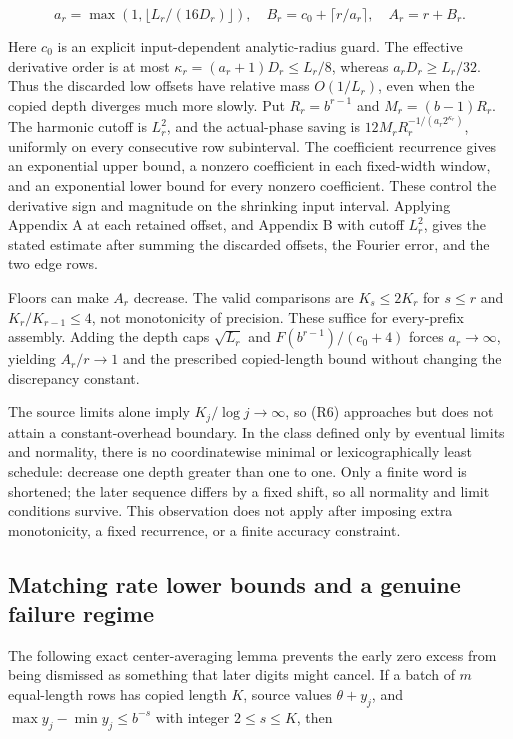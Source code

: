 \documentclass[11pt,a4paper]{article}
\begin{document}
\[
a_r=\max(1,\lfloor L_r/(16D_r)\rfloor),\quad
B_r=c_0+\lceil r/a_r\rceil,\quad A_r=r+B_r.
\]

Here \(c_0\) is an explicit input-dependent analytic-radius guard. The
effective derivative order is at most \(\kappa_r=(a_r+1)D_r\le L_r/8\),
whereas \(a_rD_r\ge L_r/32\). Thus the discarded low offsets have
relative mass \(O(1/L_r)\), even when the copied depth diverges much
more slowly. Put \(R_r=b^{r-1}\) and \(M_r=(b-1)R_r\). The harmonic
cutoff is \(L_r^2\), and the actual-phase saving is
\(12M_rR_r^{-1/(a_r2^{\kappa_r})}\), uniformly on every consecutive row
subinterval. The coefficient recurrence gives an exponential upper
bound, a nonzero coefficient in each fixed-width window, and an
exponential lower bound for every nonzero coefficient. These control the
derivative sign and magnitude on the shrinking input interval. Applying
Appendix A at each retained offset, and Appendix B with cutoff
\(L_r^2\), gives the stated estimate after summing the discarded
offsets, the Fourier error, and the two edge rows.

Floors can make \(A_r\) decrease. The valid comparisons are
\(K_s\le2K_r\) for \(s\le r\) and \(K_r/K_{r-1}\le4\), not monotonicity
of precision. These suffice for every-prefix assembly. Adding the depth
caps \(\sqrt{L_r}\) and \(F(b^{r-1})/(c_0+4)\) forces \(a_r\to\infty\),
yielding \(A_r/r\to1\) and the prescribed copied-length bound without
changing the discrepancy constant.

The source limits alone imply \(K_j/\log j\to\infty\), so (R6)
approaches but does not attain a constant-overhead boundary. In the
class defined only by eventual limits and normality, there is no
coordinatewise minimal or lexicographically least schedule: decrease one
depth greater than one to one. Only a finite word is shortened; the
later sequence differs by a fixed shift, so all normality and limit
conditions survive. This observation does not apply after imposing extra
monotonicity, a fixed recurrence, or a finite accuracy constraint.

\subsection{Matching rate lower bounds and a genuine failure
regime}\label{matching-rate-lower-bounds-and-a-genuine-failure-regime}

The following exact center-averaging lemma prevents the early zero
excess from being dismissed as something that later digits might cancel.
If a batch of \(m\) equal-length rows has copied length \(K\), source
values \(\theta+y_j\), and \(\max y_j-\min y_j\le b^{-s}\) with integer
\(2\le s\le K\), then
\end{document}
